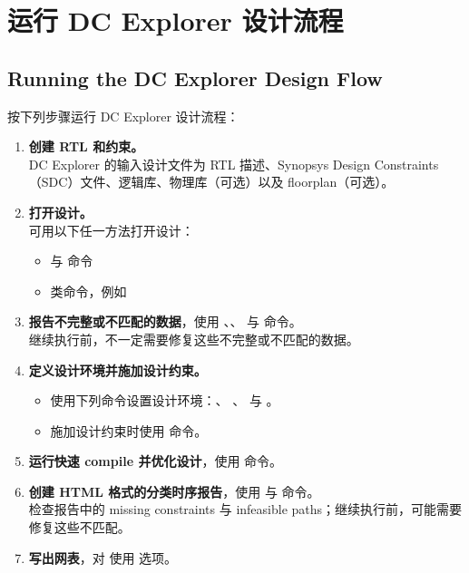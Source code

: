 \section{运行 DC Explorer 设计流程}
\subsection*{Running the DC Explorer Design Flow}

按下列步骤运行 DC Explorer 设计流程：

\begin{enumerate}
  \item \textbf{创建 RTL 和约束。}\\
        DC Explorer 的输入设计文件为 RTL 描述、Synopsys Design Constraints（SDC）文件、逻辑库、物理库（可选）以及 floorplan（可选）。

  \item \textbf{打开设计。}\\
        可用以下任一方法打开设计：
        \begin{itemize}
          \item {} 与  命令
          \item {} 类命令，例如 
        \end{itemize}

  \item \textbf{报告不完整或不匹配的数据}，使用 、、
         与  命令。\\
        继续执行前，不一定需要修复这些不完整或不匹配的数据。

  \item \textbf{定义设计环境并施加设计约束。}
        \begin{itemize}
          \item 使用下列命令设置设计环境：、
                、 与 。
          \item 施加设计约束时使用  命令。
        \end{itemize}

  \item \textbf{运行快速 compile 并优化设计}，使用  命令。

  \item \textbf{创建 HTML 格式的分类时序报告}，使用  与
         命令。\\
        检查报告中的 missing constraints 与 infeasible paths；继续执行前，可能需要修复这些不匹配。

  \item \textbf{写出网表}，对  使用  选项。
\end{enumerate}

